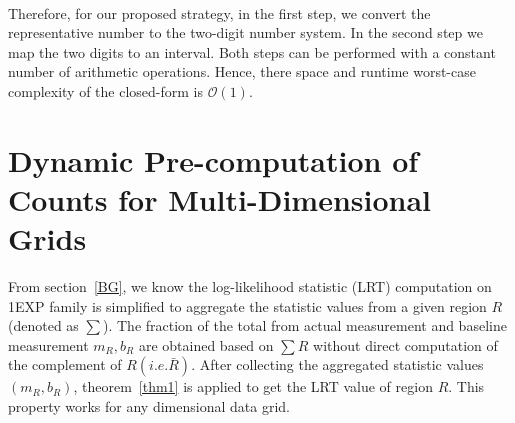 \documentclass[AMA,LATO1COL]{WileyNJD-v2}
\newcommand\bigo{\mathcal O}
\begin{document}
\begin{table}[!ht]
  \centering
  \\
  \caption{Example: Interval Transformation for even/odd number of points }\label{maptable}
\end{table}


Therefore, for our proposed strategy, in the first step, we convert the representative number to the
two-digit number system.  In the second step we map the two digits to
an interval. Both steps can be performed with a constant number of
arithmetic operations. Hence, there space and runtime worst-case
complexity of the closed-form is $\bigo(1)$.


\section{Dynamic Pre-computation of Counts for Multi-Dimensional Grids}
\label{sec:dy}
From section~\ref{BG}, we know the log-likelihood statistic (LRT)
computation on 1EXP family is simplified to aggregate the statistic
values from a given region $R$ (denoted as $\sum $). The fraction of
the total from actual measurement and baseline measurement $m_R,b_R$
are obtained based on $\sum R$ without direct computation of the
complement of $R (i.e. \bar R)$. After collecting the aggregated
statistic values $(m_R,b_R)$, theorem~\ref{thm1} is applied to get the
LRT value of region $R$. This property works for any dimensional data grid.
\end{document}
